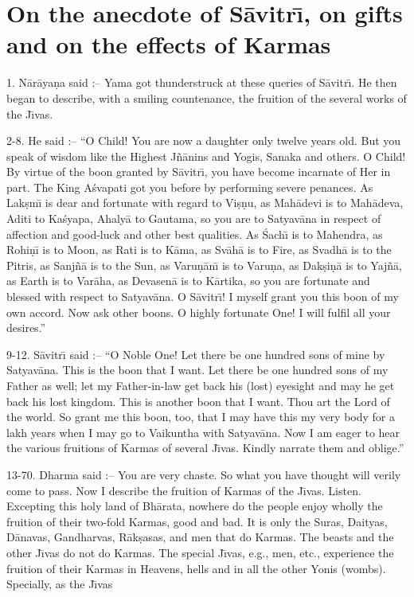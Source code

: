 \chapter{On the anecdote of S\=avitr\={\i}, on gifts and on the effects of Karmas}

1. N\=ar\=aya\d{n}a said :-- Yama got thunderstruck at these queries of S\=avitr\={\i}. He then began to describe, with a smiling countenance, the fruition of the several works of the J\={\i}vas.

2-8. He said :-- ``O Child! You are now a daughter only twelve years old. But you speak of wisdom like the Highest J\~n\=anins and Yogis, Sanaka and others. O Child! By virtue of the boon granted by S\=avitr\={\i}, you have become incarnate of Her in part. The King A\'svapati got you before by performing severe penances. As Lak\d{s}m\={\i} is dear and fortunate with regard to Vi\d{s}\d{n}u, as Mah\=adevi is to Mah\=adeva, Aditi to Ka\'syapa, Ahaly\=a to Gautama, so you are to Satyav\=ana in respect of affection and good-luck and other best qualities. As \'Sach\={\i} is to Mahendra, as Rohi\d{n}\={\i} is to Moon, as Rati is to K\=ama, as Sv\=ah\=a is to Fire, as Svadh\=a is to the Pitris, as Sanj\~n\=a is to the Sun, as Varu\d{n}\=an\={\i} is to Varu\d{n}a, as Dak\d{s}i\d{n}\=a is to Yaj\~n\=a, as Earth is to Var\=aha, as Devasen\=a is to K\=artika, so you are fortunate and blessed with respect to Satyav\=ana. O S\=avitr\={\i}! I myself grant you this boon of my own accord. Now ask other boons. O highly fortunate One! I will fulfil all your desires.''

9-12. S\=avitr\={\i} said :-- ``O Noble One! Let there be one hundred sons of mine by Satyav\=ana. This is the boon that I want. Let there be one hundred sons of my Father as well; let my Father-in-law get back his (lost) eyesight and may he get back his lost kingdom. This is another boon that I want. Thou art the Lord of the world. So grant me this boon, too, that I may have this my very body for a lakh years when I may go to Vaikuntha with Satyav\=ana. Now I am eager to hear the various fruitions of Karmas of several J\={\i}vas. Kindly narrate them and oblige.''

13-70. Dharma said :-- You are very chaste. So what you have thought will verily come to pass. Now I describe the fruition of Karmas of the J\={\i}vas. Listen. Excepting this holy land of Bh\=arata, nowhere do the people enjoy wholly the fruition of their two-fold Karmas, good and bad. It is only the Suras, Daityas, D\=anavas, Gandharvas, R\=ak\d{s}asas, and men that do Karmas. The beasts and the other J\={\i}vas do not do Karmas. The special J\={\i}vas, e.g., men, etc., experience the fruition of their Karmas in Heavens, hells and in all the other Yonis (wombs). Specially, as the J\={\i}vas

